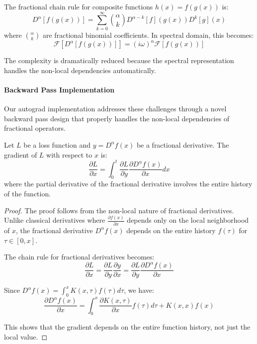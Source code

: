 The fractional chain rule for composite functions $h(x) = f(g(x))$ is:
\begin{equation}
D^{\alpha}[f(g(x))] = \sum_{k=0}^{\infty} \binom{\alpha}{k} D^{\alpha-k}[f](g(x)) D^k[g](x)
\end{equation}
where $\binom{\alpha}{k}$ are fractional binomial coefficients. In spectral domain, this becomes:
\begin{equation}
\mathcal{F}[D^{\alpha}[f(g(x))]] = (i\omega)^{\alpha} \mathcal{F}[f(g(x))]
\end{equation}

The complexity is dramatically reduced because the spectral representation handles the non-local dependencies automatically.

\paragraph{Backward Pass Implementation}

Our autograd implementation addresses these challenges through a novel backward pass design that properly handles the non-local dependencies of fractional operators.

\begin{theorem}
Let $L$ be a loss function and $y = D^{\alpha} f(x)$ be a fractional derivative. The gradient of $L$ with respect to $x$ is:
\begin{equation}
\frac{\partial L}{\partial x} = \int_0^t \frac{\partial L}{\partial y} \frac{\partial D^{\alpha} f(x)}{\partial x} dx
\end{equation}
where the partial derivative of the fractional derivative involves the entire history of the function.
\end{theorem}

\begin{proof}
The proof follows from the non-local nature of fractional derivatives. Unlike classical derivatives where $\frac{\partial f(x)}{\partial x}$ depends only on the local neighborhood of $x$, the fractional derivative $D^{\alpha} f(x)$ depends on the entire history $f(\tau)$ for $\tau \in [0,x]$.

The chain rule for fractional derivatives becomes:
\begin{equation}
\frac{\partial L}{\partial x} = \frac{\partial L}{\partial y} \frac{\partial y}{\partial x} = \frac{\partial L}{\partial y} \frac{\partial D^{\alpha} f(x)}{\partial x}
\end{equation}

Since $D^{\alpha} f(x) = \int_0^x K(x,\tau) f(\tau) d\tau$, we have:
\begin{equation}
\frac{\partial D^{\alpha} f(x)}{\partial x} = \int_0^x \frac{\partial K(x,\tau)}{\partial x} f(\tau) d\tau + K(x,x) f(x)
\end{equation}

This shows that the gradient depends on the entire function history, not just the local value.
\end{proof}

